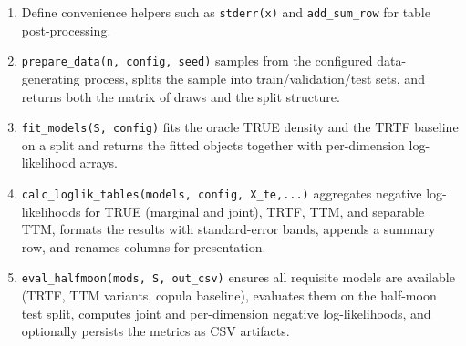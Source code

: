 \documentclass[11pt,a4paper,twoside]{book}\usepackage[]{graphicx}\usepackage[]{xcolor}
\begin{document}
\begin{enumerate}
 \item Define convenience helpers such as \texttt{stderr(x)} and \texttt{add\_sum\_row} for table post-processing.
 \item \texttt{prepare\_data(n, config, seed)} samples from the configured data-generating process, splits the sample into train/validation/test sets, and returns both the matrix of draws and the split structure.
 \item \texttt{fit\_models(S, config)} fits the oracle TRUE density and the TRTF baseline on a split and returns the fitted objects together with per-dimension log-likelihood arrays.
 \item \texttt{calc\_loglik\_tables(models, config, X\_te,...)} aggregates negative log-likelihoods for TRUE (marginal and joint), TRTF, TTM, and separable TTM, formats the results with standard-error bands, appends a summary row, and renames columns for presentation.
 \item \texttt{eval\_halfmoon(mods, S, out\_csv)} ensures all requisite models are available (TRTF, TTM variants, copula baseline), evaluates them on the half-moon test split, computes joint and per-dimension negative log-likelihoods, and optionally persists the metrics as CSV artifacts.
\end{enumerate}
\end{document}
